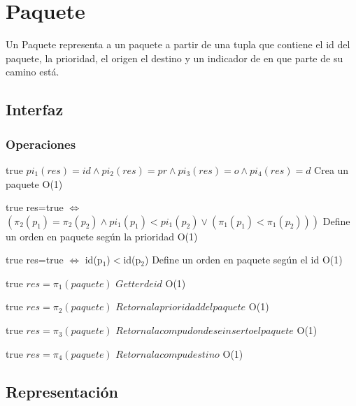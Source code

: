 \section{Paquete}

Un Paquete representa a un paquete a partir de una tupla que contiene el id del paquete, la prioridad, el origen el destino y un indicador de en que parte de su camino est\'a. 

\subsection{Interfaz}



\subsubsection*{Operaciones}

 {true}
 {$pi_1(res)=id \land pi_2(res)=pr \land pi_3(res)=o \land pi_4(res)=d$}
 {Crea un paquete}
 {O(1)}
 {}
 
 {true}
 {res=true $\iff$ $(\pi_2(p_1)=\pi_2(p_2) \land pi_1(p_1)<pi_1(p_2) \lor (\pi_1(p_1)<\pi_1(p_2)))$}
 {Define un orden en paquete seg\'un la prioridad}
 {O(1)}
 {}
 
 {true}
 {res=true $\iff$ id(p$_1$)$<$id(p$_2$)}
 {Define un orden en paquete seg\'un el id}
 {O(1)}
 {}
 
 {true}
 {$res = \pi_1(paquete)$}
 {$Getter de id$}
 {O(1)}
 {}
 
 {true}
 {$res = \pi_2(paquete)$}
 {$Retorna la prioridad del paquete$}
 {O(1)}
 {}
 
 {true}
 {$res = \pi_3(paquete)$}
 {$Retorna la compu donde se inserto el paquete$}
 {O(1)}
 {}
 
 {true}
 {$res = \pi_4(paquete)$}
 {$Retorna la compu destino$}
 {O(1)}
 {}
\subsection{Representación}

